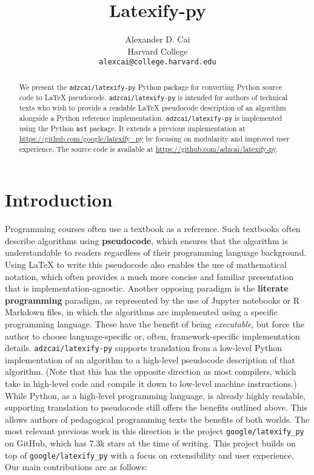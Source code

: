 \documentclass{article}
\title{Latexify-py}
\author{%
  Alexander D. Cai \\
  Harvard College \\
  \texttt{alexcai@college.harvard.edu}
}
\newcommand{\ourpkg}{\texttt{adzcai/latexify-py}}
\newcommand{\theirpkg}{\texttt{google/latexify\_py}}
\newcommand{\vocab}[1]{\textbf{#1}}
\begin{document}
\maketitle


\begin{abstract}
  We present the \ourpkg{} Python package for converting Python source code to \LaTeX{} pseudocode.
  \ourpkg{} is intended for authors of technical texts who wish to provide a readable \LaTeX{} pseudocode description of an algorithm alongside a Python reference implementation.
  \ourpkg{} is implemented using the Python \texttt{ast} package.
  It extends a previous implementation at \url{https://github.com/google/latexify_py} by focusing on modularity and improved user experience.
  The source code is available at \url{https://github.com/adzcai/latexify-py}.
\end{abstract}


\section{Introduction}

Programming courses often use a textbook as a reference.
Such textbooks often describe algorithms using \vocab{pseudocode},
which ensures that the algorithm is understandable to readers regardless of their programming language background.
Using \LaTeX{} to write this pseudocode also enables the use of mathematical notation,
which often provides a much more concise and familiar presentation that is implementation-agnostic.
Another opposing paradigm is the \vocab{literate programming} paradigm,
as represented by the use of Jupyter notebooks or R Markdown files,
in which the algorithms are implemented using a specific programming language.
These have the benefit of being \emph{executable},
but force the author to choose language-specific or, often, framework-specific implementation details.
\ourpkg{} supports translation from a low-level Python implementation of an algorithm to a high-level pseudocode description of that algorithm.
(Note that this has the opposite direction as most compilers, which take in high-level code and compile it down to low-level machine instructions.)
While Python, as a high-level programming language,
is already highly readable,
supporting translation to pseudocode still offers the benefits outlined above.
This allows authors of pedagogical programming texts the benefits of both worlds.
The most relevant previous work in this direction is the project \theirpkg{} on GitHub,
which has 7.3k stars at the time of writing.
This project builds on top of \theirpkg{} with a focus on extensibility and user experience.
Our main contributions are as follows:
\end{document}
